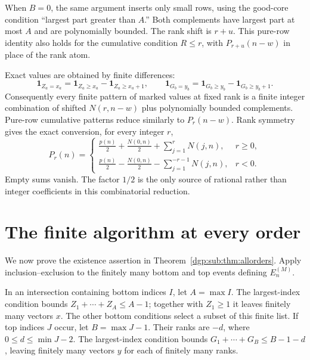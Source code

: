 \documentclass[11pt,letterpaper]{article}
\numberwithin{equation}{section}
\theoremstyle{remark}\newtheorem{remark}[theorem]{Remark}
\newcommand{\one}{\mathbf 1}
\begin{document}
When $B=0$, the same argument inserts only small rows, using the
good-core condition ``largest part greater than $A$.'' Both
complements have largest part at most $A$ and are polynomially
bounded. The rank shift is $r+u$. This pure-row identity also holds
for the cumulative condition $R\leq r$, with $P_{r+u}(n-w)$ in
place of the rank atom.

Exact values are obtained by finite differences:
\begin{equation}\label{dgp:sub:eq:exactdiff}
 \one_{Z_a=x_a}=\one_{Z_a\geq x_a}-\one_{Z_a\geq x_a+1},
 \qquad
 \one_{G_b=y_b}=\one_{G_b\geq y_b}-\one_{G_b\geq y_b+1}.
\end{equation}
Consequently every finite pattern of marked values at fixed rank
is a finite integer combination of shifted $N(r,n-w)$ plus
polynomially bounded complements. Pure-row cumulative patterns
reduce similarly to $P_r(n-w)$. Rank symmetry gives the exact
conversion, for every integer $r$,
\begin{equation}\label{dgp:sub:eq:cdf}
 P_r(n)=
 \begin{cases}
 \displaystyle\frac{p(n)}2+\frac{N(0,n)}2+\sum_{j=1}^{r}N(j,n),&r\geq0,\\[6pt]
 \displaystyle\frac{p(n)}2-\frac{N(0,n)}2-\sum_{j=1}^{-r-1}N(j,n),&r<0.
 \end{cases}
\end{equation}
Empty sums vanish. The factor $1/2$ is the only source of rational
rather than integer coefficients in this combinatorial reduction.

\section{The finite algorithm at every order}\label{dgp:sub:sec:algorithm}
We now prove the existence assertion in Theorem~\ref{dgp:sub:thm:allorders}.
Apply inclusion--exclusion to the finitely many bottom and top
events defining $E_n^{(M)}$.

In an intersection containing bottom indices $I$, let $A=\max I$.
The largest-index condition bounds $Z_1+\cdots+Z_A\leq A-1$;
together with $Z_1\geq1$ it leaves finitely many vectors $x$.
The other bottom conditions select a subset of this finite list.
If top indices $J$ occur, let $B=\max J-1$. Their ranks are
$-d$, where $0\leq d\leq\min J-2$. The largest-index condition
bounds $G_1+\cdots+G_B\leq B-1-d$, leaving finitely many vectors
$y$ for each of finitely many ranks.
\end{document}

